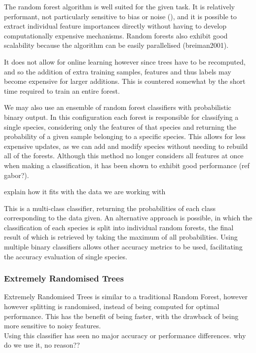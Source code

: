The random forest algorithm is well suited for the given task.
It is relatively performant, not particularly sensitive to bias or noise (\textcite{marko2004}),
and it is possible to extract individual feature importances directly without
having to develop computationally expensive mechanisms.
Random forests also exhibit good scalability because the algorithm can be easily
parallelised (breiman2001).

It does not allow for online learning however since trees have to be recomputed, 
and so the addition of extra training samples, features and thus labels may
become expensive for larger additions.
This is countered somewhat by the short time required to train an entire forest.

We may also use an ensemble of random forest classifiers with probabilistic
binary output.
In this configuration each forest is responsible for classifying a single
species, considering only the features of that species and returning the
probability of a given sample belonging to a specific species.
This allows for less expensive updates, as we can add and modify species without
needing to rebuild all of the forests.
Although this method no longer considers all features at once when making a
classification, it has been shown to exhibit good performance (ref gabor?).


explain how it fits with the data we are working with

This is a multi-class classifier, returning the probabilities of each class
corresponding to the data given.
An alternative approach is possible, in which the classification of each species
is split into individual random forests, the final result of which is retrieved
by taking the maximum of all probabilities.
Using multiple binary classifiers allows other accuracy metrics to be used,
facilitating the accuracy evaluation of single species.

\subsubsection{Extremely Randomised Trees}
Extremely Randomised Trees is similar to a traditional Random Forest, however
however splitting is randomised, instead of being computed for optimal
performance.
This has the benefit of being faster, with the drawback of being more sensitive
to noisy features.\\

Using this classifier has seen no major accuracy or performance differences.
why do we use it, no reason??

